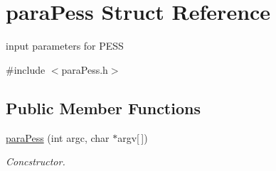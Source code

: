 \hypertarget{structparaPess}{}\section{para\+Pess Struct Reference}
\label{structparaPess}


input parameters for P\+E\+SS  




{\ttfamily \#include $<$para\+Pess.\+h$>$}

\subsection*{Public Member Functions}
\begin{DoxyCompactItemize}
\item 
\hyperlink{structparaPess_a04ddd80fab5aa5e086b3e65ce47ab7d7}{para\+Pess} (int argc, char $\ast$argv\mbox{[}$\,$\mbox{]})\hypertarget{structparaPess_a04ddd80fab5aa5e086b3e65ce47ab7d7}{}\label{structparaPess_a04ddd80fab5aa5e086b3e65ce47ab7d7}

\begin{DoxyCompactList}\small\item\em Concstructor. \end{DoxyCompactList}\end{DoxyCompactItemize}
